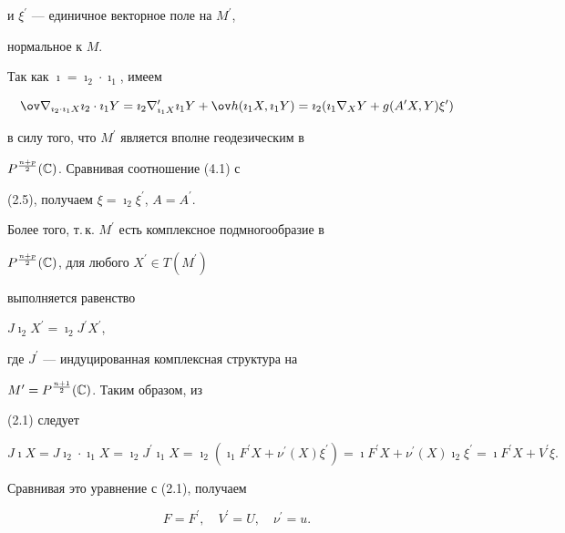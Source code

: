 и $\xi^\prime$ --- единичное векторное поле на $M^\prime$,


нормальное к $M$.





Так как $\imath=\imath_2\cdot \imath_1$, имеем


\begin{equation}


\ov \nabla_{\imath_2\cdot \imath_1 X}\imath_2\cdot


\imath_1Y=\imath_2 \nabla^\prime_{\imath_1 X}\imath_1Y+


\ov h(\imath_1 X,\imath_1 Y)=\imath_2(\imath_1


\nabla_XY+g(A^\prime X,Y)\xi^\prime)


\end{equation}


в силу того, что  $M^\prime$ является вполне геодезическим в


$P^{\frac{n+p}{2}}(\Bbb C)$. Сравнивая соотношение (4.1) с


(2.5), получаем $\xi=\imath_2 \xi^\prime$, $A=A^\prime$.


Более того, т.\,к. $M^\prime$ есть комплексное подмногообразие в


$P^{\frac{n+p}{2}}(\Bbb C)$, для любого $X^\prime\in T(M^\prime)$


выполняется равенство


$J\imath_2X^\prime=\imath_2J^\prime X^\prime$,


где $J^\prime$ --- индуцированная комплексная структура на


$M^\prime=P^{\frac{n+1}{2}}(\Bbb C)$. Таким образом, из


(2.1) следует


$$


J\imath X=J\imath_2\cdot \imath_1 X=\imath_2J^\prime \imath_1


X=\imath_2(\imath_1 F^\prime X+\nu^\prime(X)\xi^\prime) 


=\imath F^\prime X+\nu^\prime(X)\imath_2\xi^\prime=\imath


F^\prime X+V^\prime\xi.


$$


Сравнивая это уравнение с (2.1), получаем


$$


F=F^\prime,\quad V^\prime=U, \quad \nu^\prime=u.


$$





